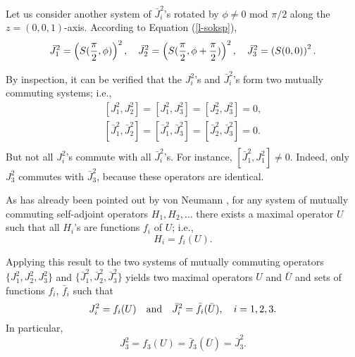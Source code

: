 Let us consider another system of $\bar{J}_i^2$'s rotated by $\phi\neq 0
\textrm{ mod } \pi /2$
along the
$z=(0,0,1)$-axis. According to
Equation
(\ref{l-soksp}),
\begin{equation}
{\bar J}_1^2= \left(S({\pi \over 2}, {\phi })\right)^2, \quad
{\bar J}_2^2= \left(S({\pi \over 2}, \phi +{\pi \over 2})\right)^2,
\quad
{\bar J}_3^2=\left(S(0,0)\right)^2.
\end{equation}


By inspection, it can be verified that the $J_i^2$'s and $\bar{J}_i^2$'s
form two mutually commuting systems; i.e.,
\begin{eqnarray*}
&[J_1^2,J_2^2]=[J_1^2,J_3^2]=[J_2^2,J_3^2]=0,&\\
&[\bar{J}_1^2,\bar{J}_2^2]=[\bar{J}_1^2,\bar{J}_3^2]=[\bar{J}_2^2,\bar{J}_3^2]=0.&\\
\end{eqnarray*}
But not all $J_i^2$'s commute with all $\bar{J}_i^2$'s. For instance,
$[\bar{J}_1^2,J_1^2]\neq 0.$
Indeed, only
$J_3^2$ commutes with $\bar{J}_3^2$, because these operators are
identical.

As has already been pointed out by von Neumann
\cite{v-neumann-49,halmos-vs,kochen2,riesz-nagy}, for any system of
mutually commuting self-adjoint operators $H_1,H_2,\ldots$ there exists
a maximal operator $U$ such that all $H_i$'s are functions $f_i$ of $U$;
i.e.,
\begin{equation}
H_i=f_i(U).
\end{equation}

Applying this result to the two systems of mutually commuting operators
$\{
J_1^2,
J_2^2,
J_3^2\}$
and
$\{
\bar{J}_1^2,
\bar{J}_2^2,
\bar{J}_3^2\}$
yields two maximal operators $U$ and $\bar{U}$ and sets of functions $f_i$,
$\bar{f}_i$ such that
\begin{equation}
J_i^2=f_i(U) \quad {\rm and }\quad
\bar{J}_i^2=\bar{f}_i(\bar{U}), \quad i=1,2,3.
\end{equation}
In particular,
\begin{equation}
J_3^2=f_3(U)=\bar{f}_3(\bar{U})=\bar{J}_3^2.
\end{equation}

